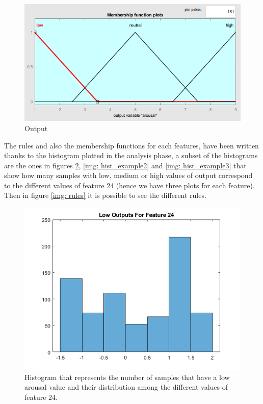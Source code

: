 \documentclass[a4paper]{report}
\begin{document}
	\begin{figure}[htbp]
		\centering
		\includegraphics[scale=0.6]{img/output_fuzzy.png}
		\caption{Output}
		\label{img: output_fuzzy}
	\end{figure}
	
	\noindent The rules and also the membership functions for each features, have been written thanks to the histogram plotted in the analysis phase, a subset of the histograms are the ones in figures \ref{img: hist_example1}, \ref{img: hist_example2} and \ref{img: hist_example3} that show how many samples with low, medium or high values of output correspond to the different values of feature 24 (hence we have three plots for each feature). Then in figure \ref{img: rules} it is possible to see the different rules.
	
		
	\begin{figure}[htbp]
		\centering
		\includegraphics[scale=0.7]{img/hist_example1.png}
		\caption{Histogram that represents the number of samples that have a low arousal value and their distribution among the different values of feature 24.}
		\label{img: hist_example1}
	\end{figure}
\end{document}
